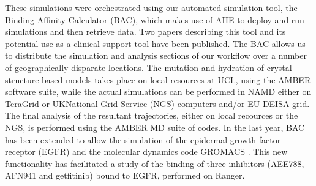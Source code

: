 These simulations were orchestrated using our automated simulation tool, the Binding Affinity Calculator (BAC), which makes use of AHE \cite{coveney2007,zasada2009} to deploy and run simulations and then retrieve data. Two papers describing this tool and its potential use as a clinical support tool have been published\cite{Sadiq2008, Sadiq2008a}. The BAC allows us to distribute the simulation and analysis sections of our workflow over a number of geographically disparate locations. The mutation and hydration of crystal structure based models takes place on local resources at UCL, using the AMBER software suite, while the actual simulations can be performed in NAMD either on TeraGrid or UKNational Grid Service (NGS) computers and/or EU DEISA grid. The final analysis of the resultant trajectories, either on local recources or the NGS, is performed using the AMBER MD suite of codes. In the last year, BAC has been extended to allow the simulation of the epidermal growth factor receptor (EGFR) and the molecular dynamics code GROMACS \cite{Hess2008}. This new functionality has facilitated a study of the binding of three inhibitors (AEE788, AFN941 and getfitinib) bound to EGFR, performed on Ranger.

